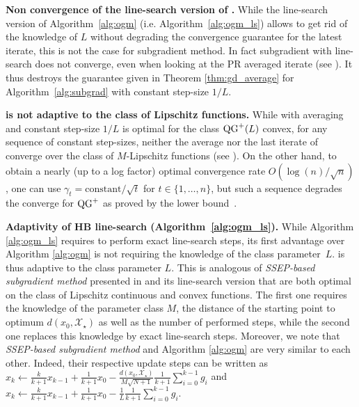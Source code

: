 \textbf{Non convergence of the line-search version of .}
While the line-search version of Algorithm~\ref{alg:ogm} (i.e. Algorithm~\ref{alg:ogm_ls}) allows to get rid of the knowledge of $L$ without degrading the convergence guarantee for the latest iterate, this is not the case for subgradient method. In fact subgradient with line-search  does not converge, even when looking at the PR averaged iterate (see ). It thus destroys the  guarantee given in Theorem \ref{thm:gd_average} for Algorithm~\ref{alg:subgrad} with constant step-size $1/L$.

\textbf{ is not adaptive to the class of Lipschitz functions.} While  with averaging and constant step-size $1/L$ is optimal for the class $\operatorname{QG}^+(L)$ convex, for any sequence of constant step-sizes, neither the average nor the last iterate of  converge over the class of $M$-Lipschitz functions (see ). On the other hand, to obtain a nearly (up to a log factor) optimal convergence rate $O(\log(n) / \sqrt{n})$, one can use $\gamma_t = \text{constant}/\sqrt{t}$ for $t\in \{1, \dots, n\}$, but such a sequence degrades the converge for $\operatorname{QG}^+$ as proved by the lower bound~.

\textbf{Adaptivity of HB line-search (Algorithm~\ref{alg:ogm_ls}).}
    While Algorithm \ref{alg:ogm_ls} requires to perform exact line-search steps, its first advantage over Algorithm \ref{alg:ogm} is not requiring the knowledge of the class parameter~$L$.  is thus  adaptive to the class parameter $L$.
    This is analogous of \emph{SSEP-based subgradient method} presented in \citet[Corollary 3]{drori2020efficient} and its line-search version \citep[See][Corollary 4]{drori2020efficient} that are both optimal on the class of Lipschitz continuous and convex functions. The first one requires the knowledge of the parameter class $M$, the distance of the starting point to optimum $d(x_0, \mathcal{X}_\star)$ as well as the number of performed steps, while the second one replaces this knowledge by exact line-search steps.
    Moreover, we note that \emph{SSEP-based subgradient method} and Algorithm \ref{alg:ogm} are very similar to each other. Indeed, their respective update steps can be written as
        $x_k \gets \frac{k}{k+1}x_{k-1} + \frac{1}{k+1}x_0 - \frac{d(x_0, \mathcal{X}_\star)}{M\sqrt{N+1}} \frac{1}{k+1}\sum_{i=0}^{k-1} g_i 
        $
        and $
        x_k \gets \frac{k}{k+1}x_{k-1} + \frac{1}{k+1}x_0 - \frac{1}{L}\frac{1}{k+1}\sum_{i=0}^{k-1} g_i.
        $
    
